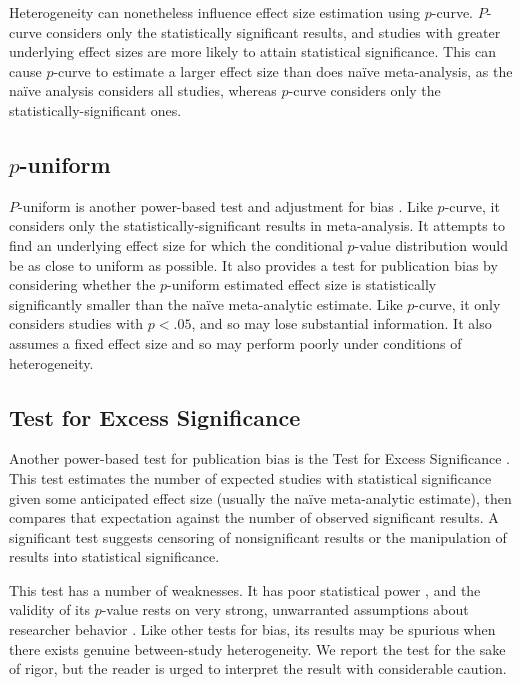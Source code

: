\documentclass[man, mask]{apa6}
\begin{document}
Heterogeneity can nonetheless influence effect size estimation using $p$-curve. $P$-curve considers only the statistically significant results, and studies with greater underlying effect sizes are more likely to attain statistical significance. This can cause $p$-curve to estimate a larger effect size than does na{\"i}ve meta-analysis, as the na{\"i}ve analysis considers all studies, whereas $p$-curve considers only the statistically-significant ones. 

\subsection{$p$-uniform}
$P$-uniform is another power-based test and adjustment for bias \citep{VanAssen:etal:2015}. Like $p$-curve, it considers only the statistically-significant results in meta-analysis. It attempts to find an underlying effect size for which the conditional $p$-value distribution would be as close to uniform as possible. It also provides a test for publication bias by considering whether the $p$-uniform estimated effect size is statistically significantly smaller than the na{\"i}ve meta-analytic estimate. Like $p$-curve, it only considers studies with $p < .05$, and so may lose substantial information. It also assumes a fixed effect size and so may perform poorly under conditions of heterogeneity.

\subsection{Test for Excess Significance}
Another power-based test for publication bias is the Test for Excess Significance \citep{Ioannidis:Trikalinos:2007}. This test estimates the number of expected studies with statistical significance given some anticipated effect size (usually the na{\"i}ve meta-analytic estimate), then compares that expectation against the number of observed significant results. A significant test suggests censoring of nonsignificant results or the manipulation of results into statistical significance.

This test has a number of weaknesses. It has poor statistical power \citep{Ioannidis:Trikalinos:2007}, and the validity of its $p$-value rests on very strong, unwarranted assumptions about researcher behavior \citep{Morey:2013}. Like other tests for bias, its results may be spurious when there exists genuine between-study heterogeneity. We report the test for the sake of rigor, but the reader is urged to interpret the result with considerable caution.
\end{document}
